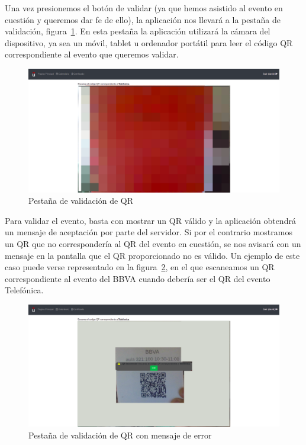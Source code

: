 \documentclass[a4paper, 12pt]{book}
\begin{document}
\begin{enumerate}
\begin{itemize}
	Una vez presionemos el botón de validar (ya que hemos asistido al evento en cuestión y queremos dar fe de ello), la aplicación nos llevará a la pestaña de validación, figura~\ref{fig:validarQR}.
	En esta pestaña la aplicación utilizará la cámara del dispositivo, ya sea un móvil, tablet u ordenador portátil para leer el código QR correspondiente al evento que queremos validar.
	\begin{figure}[h!]
  	\centering
  	\includegraphics[width=12cm, keepaspectratio]{img/validarQR.png}
  	\caption{Pestaña de validación de QR}\label{fig:validarQR}
	\end{figure}

Para validar el evento, basta con mostrar un QR válido y la aplicación obtendrá un mensaje de aceptación por parte del servidor. Si por el contrario mostramos un QR que no correspondería al QR del evento en cuestión, se nos avisará con un mensaje en la pantalla que el QR proporcionado no es válido. Un ejemplo de este caso puede verse representado en la figura~\ref{fig:validarQRFail}, en el que escaneamos un QR correspondiente al evento del BBVA cuando debería ser el QR del evento Telefónica.

	\begin{figure}[!h]
  	\centering
  	\includegraphics[width=12cm, keepaspectratio]{img/validarQRFail.png}
  	\caption{Pestaña de validación de QR con mensaje de error}\label{fig:validarQRFail}
	\end{figure}  
	

\end{itemize}
\end{enumerate}
\end{document}
